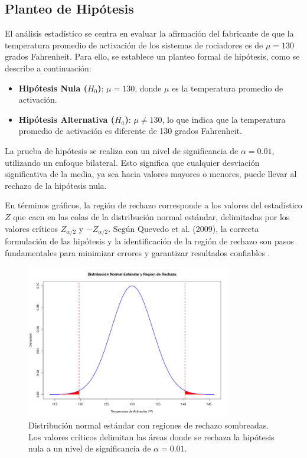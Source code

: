 \documentclass[a4paper,12pt]{article}
\begin{document}
\subsection{Planteo de Hipótesis}

El análisis estadístico se centra en evaluar la afirmación del fabricante de que la temperatura promedio de activación de los sistemas de rociadores es de \( \mu = 130 \) grados Fahrenheit. Para ello, se establece un planteo formal de hipótesis, como se describe a continuación:

\begin{itemize}
    \item \textbf{Hipótesis Nula (\( H_0 \))}: \( \mu = 130 \), donde \( \mu \) es la temperatura promedio de activación.
    \item \textbf{Hipótesis Alternativa (\( H_a \))}: \( \mu \neq 130 \), lo que indica que la temperatura promedio de activación es diferente de 130 grados Fahrenheit.
\end{itemize}

La prueba de hipótesis se realiza con un nivel de significancia de \( \alpha = 0.01 \), utilizando un enfoque bilateral. Esto significa que cualquier desviación significativa de la media, ya sea hacia valores mayores o menores, puede llevar al rechazo de la hipótesis nula.

En términos gráficos, la región de rechazo corresponde a los valores del estadístico \( Z \) que caen en las colas de la distribución normal estándar, delimitadas por los valores críticos \( Z_{\alpha/2} \) y \( -Z_{\alpha/2} \). Según Quevedo et al. (2009), la correcta formulación de las hipótesis y la identificación de la región de rechazo son pasos fundamentales para minimizar errores y garantizar resultados confiables \cite{quevedo2009}.

\begin{figure}[h!]
\centering
\includegraphics[width=0.8\textwidth]{region_rechazo.png}
\caption{Distribución normal estándar con regiones de rechazo sombreadas. Los valores críticos delimitan las áreas donde se rechaza la hipótesis nula a un nivel de significancia de \( \alpha = 0.01 \).}
\label{fig:region_rechazo}
\end{figure}
\end{document}
